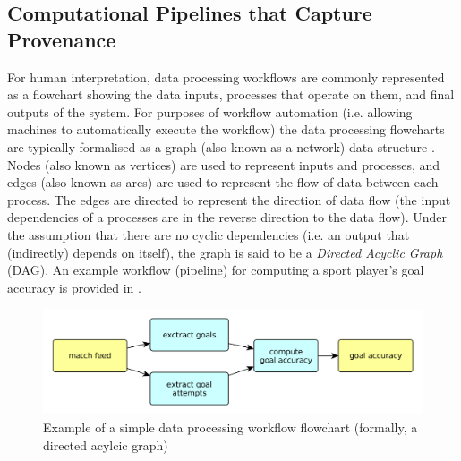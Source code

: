 

\subsection{Computational Pipelines that Capture Provenance}

For human interpretation, data processing workflows are commonly represented as a flowchart showing the data inputs, processes that operate on them, and final outputs of the system. For purposes of workflow automation (i.e. allowing machines to automatically execute the workflow) the data processing flowcharts are typically formalised as a graph (also known as a network) data-structure \cite{Bowers2006, Wu2016}. Nodes (also known as vertices) are used to represent inputs and processes, and edges (also known as arcs) are used to represent the flow of data between each process. The edges are directed to represent the direction of data flow (the input dependencies of a processes are in the reverse direction to the data flow). Under the assumption that there are no cyclic dependencies (i.e. an output that (indirectly) depends on itself), the graph is said to be a \textit{Directed Acyclic Graph} (DAG). An example workflow (pipeline) for computing a sport player's goal accuracy is provided in .


\begin{figure}[h]
\centering
\includegraphics[width=\linewidth]{figs/dag/simple-dag-no-interpediates.png}
\caption{Example of a simple data processing workflow flowchart (formally, a directed acylcic graph)}
\label{fig:simple-chain}
\end{figure}

